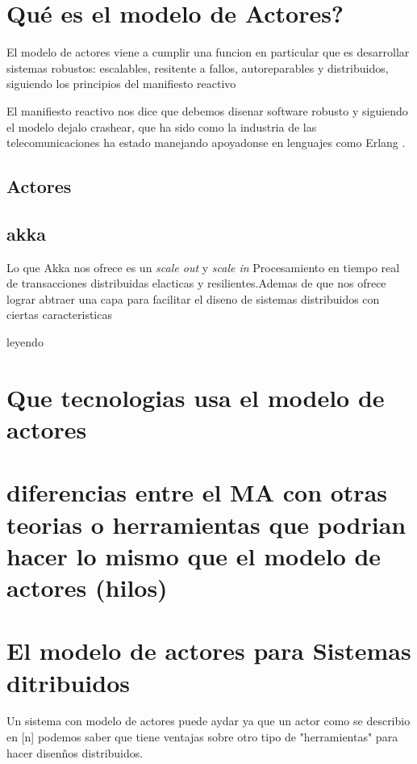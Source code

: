 \section{\textquestiondown Qu\'e es el modelo de Actores?}
El modelo de actores viene a cumplir una funcion en particular que es
desarrollar sistemas robustos: escalables, resitente a fallos,
autoreparables y distribuidos, siguiendo los principios del manifiesto
 reactivo


El manifiesto reactivo nos dice que debemos disenar software robusto y
siguiendo el modelo dejalo crashear, que ha sido como la industria de
las telecomunicaciones ha estado manejando apoyadonse en lenguajes
como Erlang .

\subsection{Actores}

\subsection{akka}
Lo que Akka nos ofrece es un\emph{ scale out} y \emph{scale in}
Procesamiento en tiempo real de transacciones distribuidas elacticas y
resilientes.Ademas de que nos ofrece lograr abtraer una capa para
facilitar el diseno de sistemas distribuidos con ciertas
caracteristicas

 leyendo

\section{Que tecnologias usa el modelo de actores}
\section{diferencias entre el MA con otras teorias o herramientas que
  podrian hacer lo mismo que el modelo de actores (hilos) }
\section{El modelo de actores para Sistemas ditribuidos }

Un sistema con modelo de actores puede aydar ya que un actor como
se describio en [n] podemos saber que tiene ventajas sobre otro tipo
de "herramientas" para hacer disen\~nos distribuidos.


